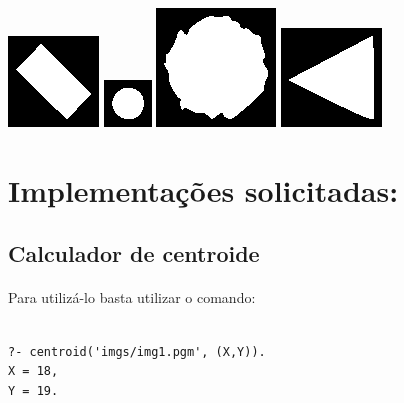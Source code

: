 \documentclass{article}
\begin{document}
\begin{center}
\includegraphics[scale=1.00]{texImgs/img6.eps}
\includegraphics[scale=1.00]{texImgs/img7.eps}
\includegraphics[scale=1.00]{texImgs/img8.eps}
\includegraphics[scale=1.00]{texImgs/img9.eps}
\end{center}

\section*{Implementações solicitadas:}
\subsection*{Calculador de centroide}
\paragraph{}

Para utilizá-lo basta utilizar o comando:

\begin{center}
\begin{minipage}{13cm}
\begin{Verbatim}

?- centroid('imgs/img1.pgm', (X,Y)).
X = 18,
Y = 19.
\end{Verbatim}
\end{minipage}
\end{center}
\end{document}
